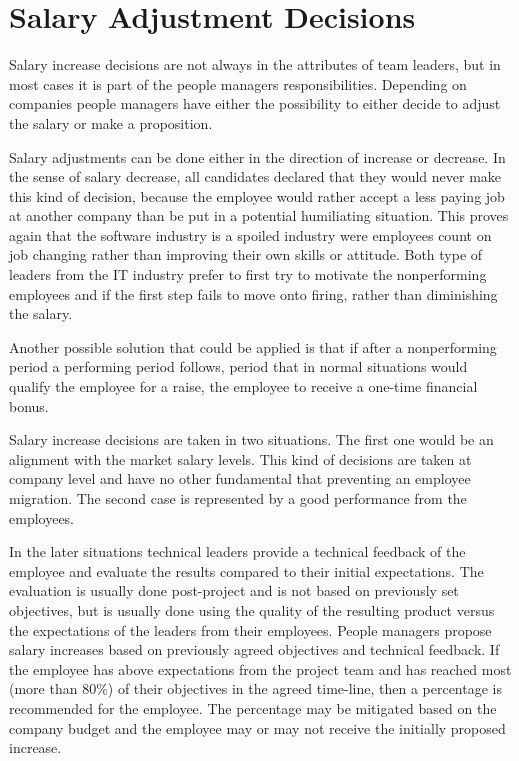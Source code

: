 \section{Salary Adjustment Decisions}
\label{sec:salary}
Salary increase decisions are not always in the attributes of team leaders, but in most cases it is part of the people managers responsibilities. Depending on companies people managers have either the possibility to either decide to adjust the salary or make a proposition.

Salary adjustments can be done either in the direction of increase or decrease. In the sense of salary decrease, all candidates declared that they would never make this kind of decision, because the employee would rather accept a less paying job at another company than be put in a potential humiliating situation. This proves again that the software industry is a spoiled industry were employees count on job changing rather than improving their own skills or attitude. Both type of leaders from the IT industry prefer to first try to motivate the nonperforming employees and if the first step fails to move onto firing, rather than diminishing the salary. 

Another possible solution that could be applied is that if after a nonperforming period a performing period follows, period that in normal situations would qualify the employee for a raise, the employee to receive a one-time financial bonus.

Salary increase decisions are taken in two situations. The first one would be an alignment with the market salary levels. This kind of decisions are taken at company level and have no other fundamental that preventing an employee migration. The second case is represented by a good performance from the employees.

In the later situations technical leaders provide a technical feedback of the employee and evaluate the results compared to their initial expectations. The evaluation is usually done post-project and is not based on previously set objectives, but is usually done using the quality of the resulting product versus the expectations of the leaders from their employees. People managers propose salary increases based on previously agreed objectives and technical feedback. If the employee has above expectations from the project team and has reached most (more than 80\%) of their objectives in the agreed time-line, then a percentage is recommended for the employee. The percentage may be mitigated based on the company budget and the employee may or may not receive the initially proposed increase.


